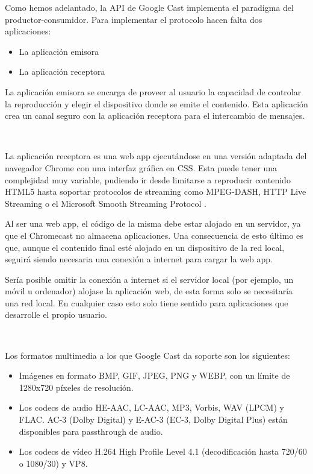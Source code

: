 Como hemos adelantado, la API de Google Cast implementa el paradigma del productor-consumidor. Para implementar el protocolo hacen falta dos aplicaciones:

\begin{itemize}
	\item La aplicación emisora 
	\item La aplicación receptora 
\end{itemize}
La aplicación emisora se encarga de proveer al usuario la capacidad de controlar la reproducción y elegir el dispositivo donde se emite el contenido.
Esta aplicación crea un canal seguro con la aplicación receptora para el intercambio de mensajes.

\

La aplicación receptora es una web app ejecutándose en una versión adaptada del navegador Chrome con una interfaz gráfica en CSS.
Esta puede tener una complejidad muy variable, pudiendo ir desde limitarse a reproducir contenido HTML5 hasta soportar protocolos de streaming como MPEG-DASH, HTTP Live Streaming o el Microsoft Smooth Streaming Protocol \cite{CastSDK}.

Al ser una web app, el código de la misma debe estar alojado en un servidor, ya que el Chromecast no almacena aplicaciones.
Una consecuencia de esto último es que, aunque el contenido final esté alojado en un dispositivo de la red local, seguirá siendo necesaria una conexión a internet para cargar la web app. 

Sería posible omitir la conexión a internet si el servidor local (por ejemplo, un móvil u ordenador) alojase la aplicación web, de esta forma solo se necesitaría una red local.
En cualquier caso esto solo tiene sentido para aplicaciones que desarrolle el propio usuario.

\

Los formatos multimedia a los que Google Cast da soporte son los siguientes:

\begin{itemize}

	\item Imágenes en formato BMP, GIF, JPEG, PNG y WEBP, con un límite de 1280x720 píxeles de resolución.

	\item Los codecs de audio HE-AAC, LC-AAC, MP3, Vorbis, WAV (LPCM) y FLAC. AC-3 (Dolby Digital) y E-AC-3 (EC-3, Dolby Digital Plus) están disponibles para passthrough de audio.

	\item Los codecs de vídeo H.264 High Profile Level 4.1 (decodificación hasta 720/60 o 1080/30) y VP8.

\end{itemize}

